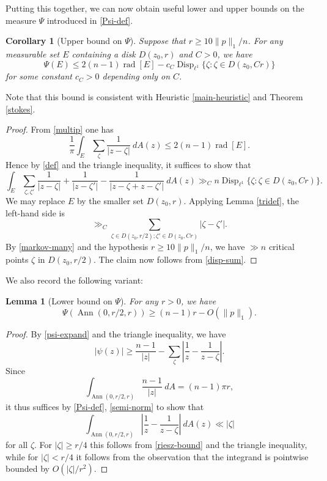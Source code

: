 \documentclass[12pt]{amsart}
\newtheorem{lemma}{Lemma}[section]
\newtheorem{corollary}{Corollary}[section]
\renewcommand{\r}{\operatorname{rad}}
\newcommand{\Disp}{\operatorname{Disp}_{\ell^1}}
\newcommand{\Ann}{\operatorname{Ann}}
\begin{document}
Putting this together, we can now obtain useful lower and upper bounds on the measure $\Psi$ introduced in \eqref{Psi-def}.

\begin{corollary}[Upper bound on $\Psi$]\label{defect-psi-cor}  Suppose that $r \geq 10\|p\|_1/n$.  For any measurable set $E$ containing a disk $D(z_0, r)$ and $C>0$, we have
$$ \Psi(E) \leq 2(n-1) \r[E] - c_C \Disp \{ \zeta : \zeta \in D(z_0, Cr) \}$$
for some constant $c_C>0$ depending only on $C$.
\end{corollary}

Note that this bound is consistent with Heuristic \ref{main-heuristic} and Theorem \ref{stokes}.

\begin{proof}  From \eqref{multip} one has
$$ \frac{1}{\pi} \int_{E} \sum_\zeta \frac{1}{|z-\zeta|}\ dA(z) \leq 2(n-1) \r[E].$$
Hence by \eqref{def} and the triangle inequality, it suffices to show that
$$ \int_{E} \sum_{\zeta,\zeta'} \frac{1}{|z-\zeta|} + \frac{1}{|z-\zeta'|} - \frac{1}{|z-\zeta + z-\zeta'|}\ dA(z) \gg_C n \Disp \{ \zeta : \zeta \in D(z_0, Cr) \}.$$
We may replace $E$ by the smaller set $D(z_0,r)$.  Applying Lemma \ref{tridef}, the left-hand side is
$$ \gg_C \sum_{\zeta \in D(z_0,r/2); \zeta' \in D(z_0,Cr)} |\zeta-\zeta'|.$$
By \eqref{markov-many} and the hypothesis $r \geq 10\|p\|_1/n$, we have $\gg n$ critical points $\zeta$ in $D(z_0,r/2)$.  The claim now follows from \eqref{disp-sum}.
\end{proof}

We also record the following variant:

\begin{lemma}[Lower bound on $\Psi$]\label{ankh}  For any $r>0$, we have
$$ \Psi(\Ann(0,r/2,r))\geq (n-1) r - O(\|p\|_1).$$
\end{lemma}

\begin{proof} By \eqref{psi-expand} and the triangle inequality, we have
$$ |\psi(z)| \geq \frac{n-1}{|z|} - \sum_\zeta \left| \frac{1}{z} - \frac{1}{z-\zeta}\right|.$$
Since
$$ \int_{\Ann(0,r/2,r)} \frac{n-1}{|z|}\ dA = (n-1) \pi r,$$
it thus suffices by \eqref{Psi-def}, \eqref{semi-norm} to show that
$$ \int_{\Ann(0,r/2,r)} \left| \frac{1}{z} - \frac{1}{z-\zeta}\right|\ dA(z) \ll |\zeta|$$
for all $\zeta$.  For $|\zeta| \geq r/4$ this follows from \eqref{riesz-bound} and the triangle inequality, while for $|\zeta| < r/4$ it follows from the observation that the integrand is pointwise bounded by $O(|\zeta|/r^2)$.
\end{proof}
\end{document}
